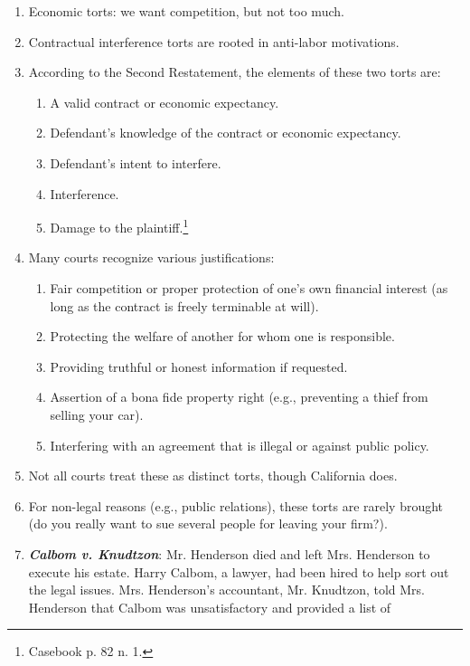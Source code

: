 \begin{enumerate}
    \item Economic torts: we want competition, but not too much.
    \item Contractual interference torts are rooted in anti-labor motivations.
    \item According to the Second Restatement, the elements of these two torts 
    are:
    \begin{enumerate}
        \item A valid contract or economic expectancy.
        \item Defendant's knowledge of the contract or economic expectancy.
        \item Defendant's intent to interfere.
        \item Interference.
        \item Damage to the plaintiff.\footnote{Casebook p. 82 n. 1.}
    \end{enumerate}
    \item Many courts recognize various justifications:
    \begin{enumerate}
        \item Fair competition or proper protection of one's own financial 
        interest (as long as the contract is freely terminable at will).
        \item Protecting the welfare of another for whom one is responsible.
        \item Providing truthful or honest information if requested.
        \item Assertion of a bona fide property right (e.g., preventing a 
        thief from selling your car).
        \item Interfering with an agreement that is illegal or against public 
        policy.
    \end{enumerate}
    \item Not all courts treat these as distinct torts, though California 
    does.
    \item For non-legal reasons (e.g., public relations), these torts are 
    rarely brought (do you really want to sue several people for leaving your 
    firm?).
    \item \textbf{\emph{Calbom v. Knudtzon}}: Mr. Henderson died and left Mrs. 
    Henderson to execute his estate. Harry Calbom, a lawyer, had been hired to 
    help sort out the legal issues. Mrs. Henderson's accountant, Mr. Knudtzon, 
    told Mrs. Henderson that Calbom was unsatisfactory and provided a list of 

\end{enumerate}
